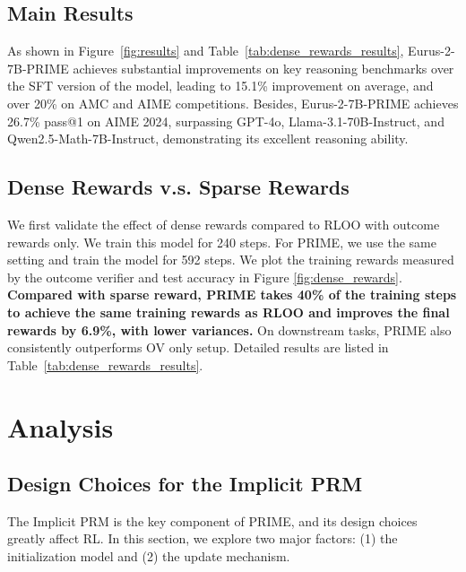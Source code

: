 

\subsection{Main Results}

As shown in Figure~\ref{fig:results} and Table~\ref{tab:dense_rewards_results}, Eurus-2-7B-PRIME achieves substantial improvements on key reasoning benchmarks over the SFT version of the model, leading to 15.1\% improvement on average, and over 20\% on AMC and AIME competitions. Besides, Eurus-2-7B-PRIME achieves 26.7\% pass@1 on AIME 2024, surpassing GPT-4o, Llama-3.1-70B-Instruct, and Qwen2.5-Math-7B-Instruct, demonstrating its excellent reasoning ability.

%


\subsection{Dense Rewards v.s. Sparse Rewards}
We first validate the effect of dense rewards compared to RLOO with outcome rewards only. 
We train this model for 240 steps. For PRIME, we use the same setting and train the model for 592 steps. We plot the training rewards measured by the outcome verifier and test accuracy in Figure \ref{fig:dense_rewards}. \textbf{Compared with sparse reward, PRIME  takes 40\% of the training steps to achieve the same training rewards as RLOO and improves the final rewards by 6.9\%, with lower variances.} On downstream tasks, PRIME also consistently outperforms OV only setup. Detailed results are listed in Table~\ref{tab:dense_rewards_results}.
\vspace{-10pt}


\section{Analysis}

\subsection{Design Choices for the Implicit PRM}
\label{sec:design}
The Implicit PRM is the key component of PRIME, and its design choices greatly affect RL. In this section, we explore two major factors: (1) the initialization model and (2) the update mechanism.

